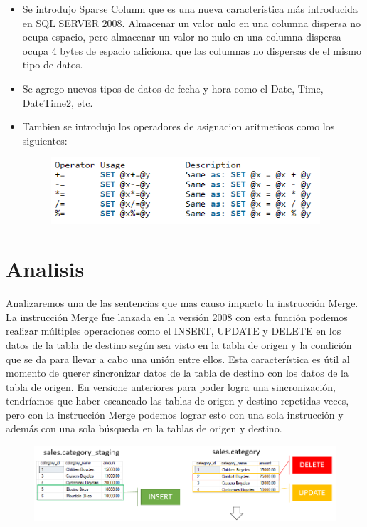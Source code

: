 \documentclass[preprint,12pt]{elsarticle}
\begin{document}
\begin{itemize}
\item Se introdujo Sparse Column que es una nueva característica más introducida en SQL SERVER 2008. Almacenar un valor nulo en una columna dispersa no ocupa espacio, pero almacenar un valor no nulo en una columna dispersa ocupa 4 bytes de espacio adicional que las columnas no dispersas de el mismo tipo de datos.
\item Se agrego nuevos tipos de datos de fecha y hora como el Date, Time, DateTime2, etc.
\item Tambien se introdujo los operadores de asignacion aritmeticos como los siguientes:
\begin{figure}[htb]
	\begin{center}
		\includegraphics[width=10cm]{./IMAGENES/huichi6}
	\end{center}
\end{figure}

\end{itemize}


\section{Analisis}

Analizaremos una de las sentencias que mas causo impacto la instrucción Merge. La instrucción Merge fue lanzada en la versión 2008 con esta función podemos realizar múltiples operaciones como el INSERT, UPDATE y DELETE en los datos de la tabla de destino según sea visto en la tabla de origen y la condición que se da para llevar a cabo una unión entre ellos.
Esta característica es útil al momento de querer sincronizar datos de la tabla de destino con los datos de la tabla de origen. En versione anteriores para poder logra una sincronización, tendríamos que haber escaneado las tablas de origen y destino repetidas veces, pero con la instrucción Merge podemos lograr esto con una sola instrucción y además con una sola búsqueda en la tablas de origen y destino.

\begin{figure}[htb]
	\begin{center}
		\includegraphics[width=14cm]{./IMAGENES/huichi3}
	\end{center}
\end{figure}
\end{document}
